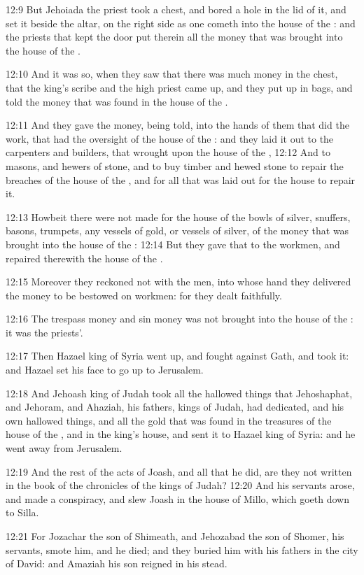 12:9 But Jehoiada the priest took a chest, and bored a hole in the lid of it, and set it beside the altar, on the right side as one cometh into the house of the \LORD: and the priests that kept the door put therein all the money that was brought into the house of the \LORD.

12:10 And it was so, when they saw that there was much money in the chest, that the king's scribe and the high priest came up, and they put up in bags, and told the money that was found in the house of the \LORD.

12:11 And they gave the money, being told, into the hands of them that did the work, that had the oversight of the house of the \LORD: and they laid it out to the carpenters and builders, that wrought upon the house of the \LORD, 12:12 And to masons, and hewers of stone, and to buy timber and hewed stone to repair the breaches of the house of the \LORD, and for all that was laid out for the house to repair it.

12:13 Howbeit there were not made for the house of the \LORD bowls of silver, snuffers, basons, trumpets, any vessels of gold, or vessels of silver, of the money that was brought into the house of the \LORD: 12:14 But they gave that to the workmen, and repaired therewith the house of the \LORD.

12:15 Moreover they reckoned not with the men, into whose hand they delivered the money to be bestowed on workmen: for they dealt faithfully.

12:16 The trespass money and sin money was not brought into the house of the \LORD: it was the priests'.

12:17 Then Hazael king of Syria went up, and fought against Gath, and took it: and Hazael set his face to go up to Jerusalem.

12:18 And Jehoash king of Judah took all the hallowed things that Jehoshaphat, and Jehoram, and Ahaziah, his fathers, kings of Judah, had dedicated, and his own hallowed things, and all the gold that was found in the treasures of the house of the \LORD, and in the king's house, and sent it to Hazael king of Syria: and he went away from Jerusalem.

12:19 And the rest of the acts of Joash, and all that he did, are they not written in the book of the chronicles of the kings of Judah?  12:20 And his servants arose, and made a conspiracy, and slew Joash in the house of Millo, which goeth down to Silla.

12:21 For Jozachar the son of Shimeath, and Jehozabad the son of Shomer, his servants, smote him, and he died; and they buried him with his fathers in the city of David: and Amaziah his son reigned in his stead.

